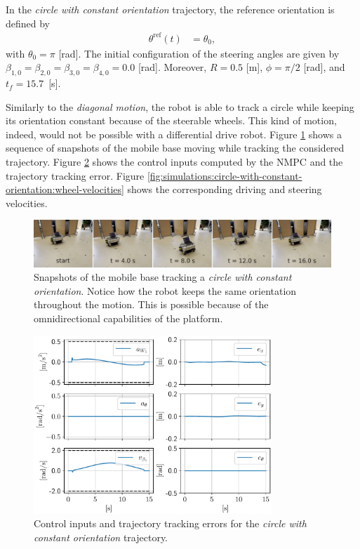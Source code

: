 In the \textit{circle with constant orientation} trajectory,
the reference orientation is defined by
\begin{subequations}
\begin{align*}
    \theta^{\mathrm{ref}}(t) &= \theta_0,
\end{align*}
\end{subequations}
with $\theta_0=\pi$ [rad]. The initial configuration of the steering angles
are given by$\beta_{1,0}=\beta_{2,0}=\beta_{3,0}=\beta_{4,0}=0.0$ [rad].
Moreover, $R=0.5$ [m], $\phi=\pi/2$ [rad], and $t_f=15.7$~[s].

Similarly to the \textit{diagonal motion}, the robot is able to track a
circle while keeping its orientation constant because of the steerable wheels.
This kind of motion, indeed, would not be possible with a differential drive robot.
Figure \ref{fig:experiments:circle-with-constant-orientation:snapshots}
shows a sequence of snapshots of the mobile base moving while tracking the
considered trajectory.
Figure \ref{fig:simulations:circle-with-constant-orientation:inputs-and-errors}
shows the control inputs computed by the NMPC and the trajectory tracking error.
Figure \ref{fig:simulations:circle-with-constant-orientation:wheel-velocities}
shows the corresponding driving and steering velocities.
\begin{figure}
    \centering
    \includegraphics[width=\textwidth]{figures/SWMR/simulations/circular_with_constant_orientation/snapshots.jpeg}
    \caption{Snapshots of the mobile base tracking a
        \textit{circle with constant orientation}. Notice how the robot keeps 
        the same orientation throughout the motion. This is possible because 
        of the omnidirectional capabilities of the platform.}
    \label{fig:experiments:circle-with-constant-orientation:snapshots}
\end{figure}
\begin{figure}
    \centering
    \includegraphics[width=0.8\textwidth]{figures/SWMR/simulations/circular_with_constant_orientation/inputs_and_errors.pdf}
    \caption{Control inputs and trajectory tracking errors for the \textit{circle with constant orientation} trajectory.}
    \label{fig:simulations:circle-with-constant-orientation:inputs-and-errors}
\end{figure}
